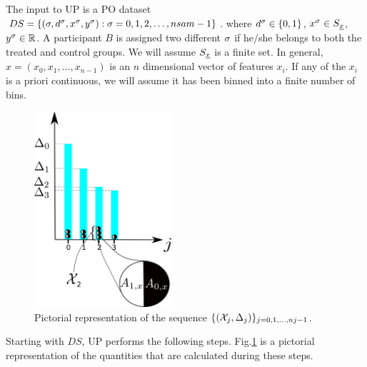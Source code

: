 The input
to UP is a PO
dataset $DS= \{ (\sigma, d^\sigma, x^\sigma, y^\sigma):
 \sigma=0,1, 2, \ldots, nsam-1\}$.
where $d^\sigma\in \{0,1\}$, $x^\sigma \in S_{\underline{x}}$,
$y^\sigma\in { \mathbb{R}}$.
A  participant $B$
is assigned two different
$\sigma$
if he/she
belongs to
both the treated and control groups.
We will assume 
$S_{\underline{x}}$ is a finite set.
In general,
$x=(x_0, x_1,\dots, x_{n-1})$ is an $n$ dimensional 
vector of features $x_i$.
If any of the $x_i$
is a priori continuous, we will
assume it has  been binned into
a finite number of bins.

\begin{figure}[h!]
\centering
\includegraphics[width=2in]
{uplift/uplift-bins.png}
\caption{
Pictorial
representation
of the sequence
$\{({\cal X}_j, \Delta_j)\}_{j=0,1, \ldots, nj-1}$.
}
\label{fig-uplift-bins}
\end{figure}


Starting with $DS$,
UP performs the following steps.
Fig.\ref{fig-uplift-bins}
is a pictorial representation
of the quantities
that are calculated
during these steps.

